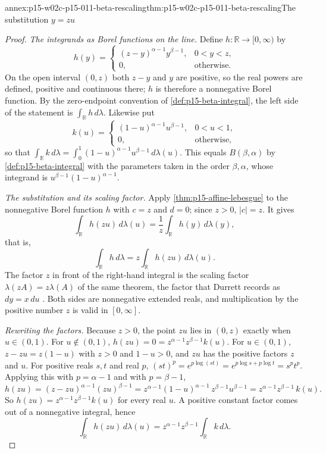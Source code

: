 \begin{annexitem}{annex:p15-w02c-p15-011-beta-rescaling}{thm:p15-w02c-p15-011-beta-rescaling}{The substitution \(y=zu\)}
\begin{proof}
\emph{The integrands as Borel functions on the line.} Define
\(h:\mathbb R\to[0,\infty)\) by
\[
 h(y)=\begin{cases}
  (z-y)^{\alpha-1}y^{\beta-1},&0<y<z,\\
  0,&\text{otherwise}.
 \end{cases}
\]
On the open interval \((0,z)\) both \(z-y\) and \(y\) are positive, so the
real powers are defined, positive and continuous there; \(h\) is therefore
a nonnegative Borel function. By the zero-endpoint convention of
\cref{def:p15-beta-integral}, the left side of the statement is
\(\int_{\mathbb R}h\,d\lambda\). Likewise put
\[
 k(u)=\begin{cases}
  (1-u)^{\alpha-1}u^{\beta-1},&0<u<1,\\
  0,&\text{otherwise},
 \end{cases}
\]
so that \(\int_{\mathbb R}k\,d\lambda=\int_0^1(1-u)^{\alpha-1}u^{\beta-1}\,
d\lambda(u)\). This equals \(B(\beta,\alpha)\) by
\cref{def:p15-beta-integral} with the parameters taken in the order
\(\beta,\alpha\), whose integrand is \(u^{\beta-1}(1-u)^{\alpha-1}\).

\emph{The substitution and its scaling factor.} Apply
\cref{thm:p15-affine-lebesgue} to the nonnegative Borel function \(h\) with
\(c=z\) and \(d=0\); since \(z>0\), \(|c|=z\). It gives
\[
 \int_{\mathbb R}h(zu)\,d\lambda(u)=\frac1z\int_{\mathbb R}h(y)\,d\lambda(y),
\]
that is,
\[
 \int_{\mathbb R}h\,d\lambda=z\int_{\mathbb R}h(zu)\,d\lambda(u).
\]
The factor \(z\) in front of the right-hand integral is the scaling factor
\(\lambda(zA)=z\lambda(A)\) of the same theorem, the factor that Durrett
records as \(dy=x\,du\) \cite[p.~51, (2.1.1)]{DurrettPTEAuthor2019}. Both
sides are nonnegative extended reals, and multiplication by the positive
number \(z\) is valid in \([0,\infty]\).

\emph{Rewriting the factors.} Because \(z>0\), the point \(zu\) lies in
\((0,z)\) exactly when \(u\in(0,1)\). For \(u\notin(0,1)\),
\(h(zu)=0=z^{\alpha-1}z^{\beta-1}k(u)\). For \(u\in(0,1)\),
\(z-zu=z(1-u)\) with \(z>0\) and \(1-u>0\), and \(zu\) has the positive
factors \(z\) and \(u\). For positive reals \(s,t\) and real \(p\),
\((st)^p=e^{p\log(st)}=e^{p\log s+p\log t}=s^pt^p\). Applying this with
\(p=\alpha-1\) and with \(p=\beta-1\),
\[
 h(zu)=(z-zu)^{\alpha-1}(zu)^{\beta-1}
      =z^{\alpha-1}(1-u)^{\alpha-1}\,z^{\beta-1}u^{\beta-1}
      =z^{\alpha-1}z^{\beta-1}\,k(u).
\]
So \(h(zu)=z^{\alpha-1}z^{\beta-1}k(u)\) for every real \(u\). A positive
constant factor comes out of a nonnegative integral, hence
\[
 \int_{\mathbb R}h(zu)\,d\lambda(u)
   =z^{\alpha-1}z^{\beta-1}\int_{\mathbb R}k\,d\lambda .
\]


\end{proof}
\end{annexitem}
